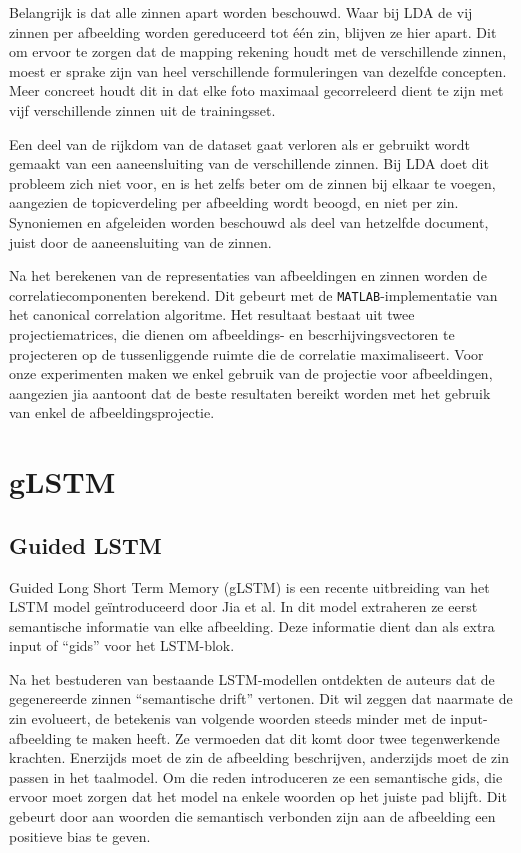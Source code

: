  Belangrijk is dat alle zinnen apart worden beschouwd. Waar bij LDA de vij zinnen per afbeelding worden gereduceerd tot \'e\'en zin, blijven ze hier apart. Dit om ervoor te zorgen dat de mapping rekening houdt met de verschillende zinnen, moest er sprake zijn van heel verschillende formuleringen van dezelfde concepten. Meer concreet houdt dit in dat elke foto maximaal gecorreleerd dient te zijn met vijf verschillende zinnen uit de trainingsset.

Een deel van de rijkdom van de dataset gaat verloren als er gebruikt wordt gemaakt van een aaneensluiting van de verschillende zinnen. Bij LDA doet dit probleem zich niet voor, en is het zelfs beter om de zinnen bij elkaar te voegen, aangezien de topicverdeling per afbeelding wordt beoogd, en niet per zin. Synoniemen en afgeleiden worden beschouwd als deel van hetzelfde document, juist door de aaneensluiting van de zinnen.

Na het berekenen van de representaties van afbeeldingen en zinnen worden de correlatiecomponenten berekend. Dit gebeurt met de \texttt{MATLAB}-implementatie van het canonical correlation algoritme. Het resultaat bestaat uit twee projectiematrices, die dienen om afbeeldings- en bescrhijvingsvectoren te projecteren op de tussenliggende ruimte die de correlatie maximaliseert. Voor onze experimenten maken we enkel gebruik van de projectie voor afbeeldingen, aangezien jia  aantoont dat de beste resultaten bereikt worden met het gebruik van enkel de afbeeldingsprojectie.

\section{gLSTM}
\subsection{Guided LSTM}
Guided Long Short Term Memory (gLSTM) is een recente uitbreiding van het LSTM model ge\"introduceerd door Jia et al.  In dit model extraheren ze eerst semantische informatie van elke afbeelding. Deze informatie dient dan als extra input of ``gids'' voor het LSTM-blok.

Na het bestuderen van bestaande LSTM-modellen ontdekten de auteurs dat de gegenereerde zinnen ``semantische drift'' vertonen. Dit wil zeggen dat naarmate de zin evolueert, de betekenis van volgende woorden steeds minder met de input-afbeelding te maken heeft. Ze vermoeden dat dit komt door twee tegenwerkende krachten. Enerzijds moet de zin de afbeelding beschrijven, anderzijds moet de zin passen in het taalmodel. Om die reden introduceren ze een semantische gids, die ervoor moet zorgen dat het model na enkele woorden op het juiste pad blijft. Dit gebeurt door aan woorden die semantisch verbonden zijn aan de afbeelding een positieve bias te geven.

